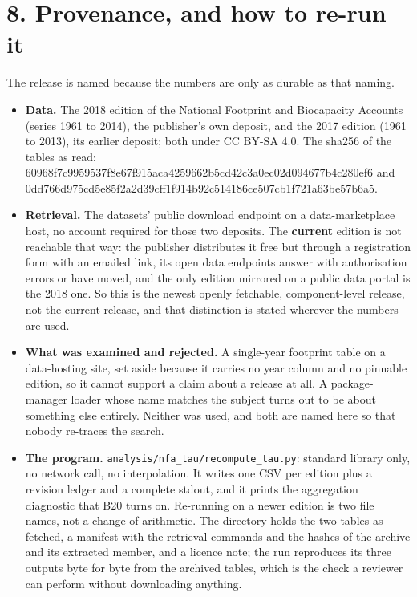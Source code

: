 \documentclass[11pt]{article}
\begin{document}
\vspace{0.8em}

\vspace{0.8em}

\section*{8. Provenance, and how to re-run it}\label{8-provenance-and-how-to-re-run-it}

The release is named because the numbers are only as durable as that naming.

\begin{itemize}\setlength{\itemsep}{2pt}
\item \textbf{Data.} The 2018 edition of the National Footprint and Biocapacity Accounts (series 1961 to 2014), the publisher's own deposit, and the 2017 edition (1961 to 2013), its earlier deposit; both under CC BY-SA 4.0. The sha256 of the tables as read: 60968f7c9959537f8e67f915aca4259662b5cd42c3a0ec02d094677b4c280ef6 and 0dd766d975cd5e85f2a2d39cff1f914b92c514186ce507cb1f721a63be57b6a5.
\item \textbf{Retrieval.} The datasets' public download endpoint on a data-marketplace host, no account required for those two deposits. The \textbf{current} edition is not reachable that way: the publisher distributes it free but through a registration form with an emailed link, its open data endpoints answer with authorisation errors or have moved, and the only edition mirrored on a public data portal is the 2018 one. So this is the newest openly fetchable, component-level release, not the current release, and that distinction is stated wherever the numbers are used.
\item \textbf{What was examined and rejected.} A single-year footprint table on a data-hosting site, set aside because it carries no year column and no pinnable edition, so it cannot support a claim about a release at all. A package-manager loader whose name matches the subject turns out to be about something else entirely. Neither was used, and both are named here so that nobody re-traces the search.
\item \textbf{The program.} \texttt{analysis/nfa\_tau/recompute\_tau.py}: standard library only, no network call, no interpolation. It writes one CSV per edition plus a revision ledger and a complete stdout, and it prints the aggregation diagnostic that B20 turns on. Re-running on a newer edition is two file names, not a change of arithmetic. The directory holds the two tables as fetched, a manifest with the retrieval commands and the hashes of the archive and its extracted member, and a licence note; the run reproduces its three outputs byte for byte from the archived tables, which is the check a reviewer can perform without downloading anything.

\end{itemize}
\end{document}
